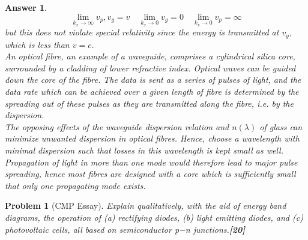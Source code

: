 \documentclass[a4paper]{article}
\newtheorem{ans}{Answer}[subsection]
\theoremstyle{new}
\newtheorem{qns}{Problem}[subsection]
\begin{document}
\begin{ans}
$$\lim_{k_x\rightarrow\infty}v_p,v_g=v\quad\lim_{k_x\rightarrow0}v_g=0\quad\lim_{k_x\rightarrow0}v_p=\infty$$
but this does not violate special relativity since the energy is transmitted at $v_g$, which is less than $v=c$.\\[5pt]
An optical fibre, an example of a waveguide, comprises a cylindrical silica core, surrounded by a cladding of lower refractive index. Optical waves can be guided down the core of the fibre. The data is sent as a series of pulses of light, and the data rate which can be achieved over a given length of fibre is determined by the spreading out of these pulses as they are transmitted along the fibre, i.e. by the dispersion.\\[5pt]
The opposing effects of the waveguide dispersion relation and $n(\lambda)$ of glass can minimize unwanted dispersion in optical fibres. Hence, choose a wavelength with minimal dispersion such that losses in this wavelength is kept small as well.\\[5pt]
Propagation of light in more than one mode would therefore lead to major pulse spreading, hence most fibres are designed with a core which is sufficiently small that only one propagating mode exists.
\end{ans}
\newpage
\begin{qns}[CMP Essay]
Explain qualitatively, with the aid of energy band diagrams, the operation of (a) rectifying diodes, (b) light emitting diodes, and (c) photovoltaic cells, all based on semiconductor p−n junctions.\hfill\textbf{[20]}
\end{qns}
\end{document}
